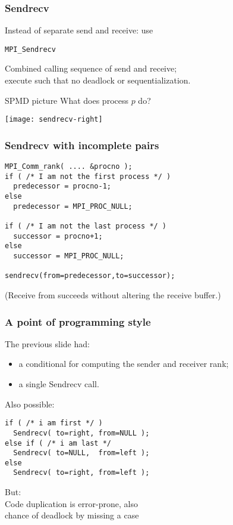 \begin{frame}[containsverbatim]\frametitle{Sendrecv}
  Instead of separate send and receive: use

  \lstinline{MPI_Sendrecv}

  Combined calling sequence of send and receive;\\
  execute such that no deadlock or sequentialization.
\end{frame}


\begin{frame}{SPMD picture}
  What does process $p$ do?
  
  \texttt{[image: sendrecv-right]}
\end{frame}

\begin{frame}[containsverbatim]\frametitle{Sendrecv with incomplete pairs}
\lstset{language=C}
\begin{lstlisting}
MPI_Comm_rank( .... &procno );
if ( /* I am not the first process */ )
  predecessor = procno-1;
else
  predecessor = MPI_PROC_NULL;

if ( /* I am not the last process */ )
  successor = procno+1;
else
  successor = MPI_PROC_NULL;

sendrecv(from=predecessor,to=successor);  
\end{lstlisting}
(Receive from  succeeds without altering
the receive buffer.)
\end{frame}

\begin{frame}[containsverbatim]\frametitle{A point of programming style}
  The previous slide had:
  \begin{itemize}
  \item a conditional for computing the sender and receiver rank;
  \item a single Sendrecv call.
  \end{itemize}
  Also possible:
\lstset{language=C}
\begin{lstlisting}
if ( /* i am first */ )
  Sendrecv( to=right, from=NULL );
else if ( /* i am last */
  Sendrecv( to=NULL,  from=left );
else 
  Sendrecv( to=right, from=left );
\end{lstlisting}
But:\\
Code duplication is error-prone, also\\
chance of deadlock by missing a case
\end{frame}

